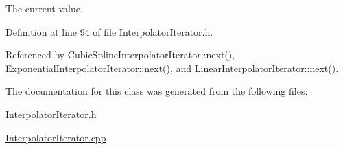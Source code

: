 The current value. 

Definition at line 94 of file Interpolator\-Iterator.h.

Referenced by Cubic\-Spline\-Interpolator\-Iterator::next(), Exponential\-Interpolator\-Iterator::next(), and Linear\-Interpolator\-Iterator::next().

The documentation for this class was generated from the following files:\begin{CompactItemize}
\item 
\hyperlink{InterpolatorIterator_8h}{Interpolator\-Iterator.h}\item 
\hyperlink{InterpolatorIterator_8cpp}{Interpolator\-Iterator.cpp}\end{CompactItemize}
